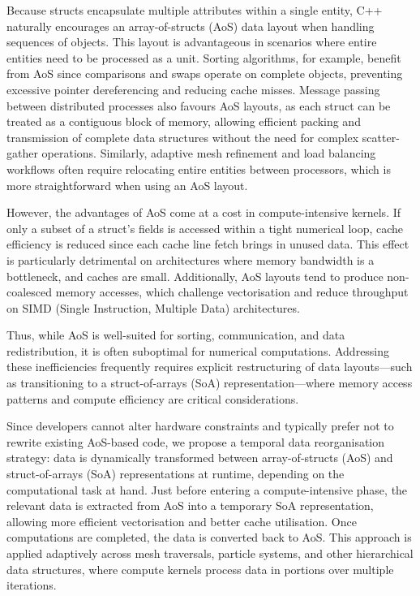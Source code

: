 Because structs encapsulate multiple attributes within a single entity, C++ naturally encourages an array-of-structs (AoS) data layout when handling sequences of objects. This layout is advantageous in scenarios where entire entities need to be processed as a unit. Sorting algorithms, for example, benefit from AoS since comparisons and swaps operate on complete objects, preventing excessive pointer dereferencing and reducing cache misses. Message passing between distributed processes also favours AoS layouts, as each struct can be treated as a contiguous block of memory, allowing efficient packing and transmission of complete data structures without the need for complex scatter-gather operations. Similarly, adaptive mesh refinement and load balancing workflows often require relocating entire entities between processors, which is more straightforward when using an AoS layout.

However, the advantages of AoS come at a cost in compute-intensive kernels. If only a subset of a struct’s fields is accessed within a tight numerical loop, cache efficiency is reduced since each cache line fetch brings in unused data. This effect is particularly detrimental on architectures where memory bandwidth is a bottleneck, and caches are small. Additionally, AoS layouts tend to produce non-coalesced memory accesses, which challenge vectorisation and reduce throughput on SIMD (Single Instruction, Multiple Data) architectures.

Thus, while AoS is well-suited for sorting, communication, and data redistribution, it is often suboptimal for numerical computations. Addressing these inefficiencies frequently requires explicit restructuring of data layouts—such as transitioning to a struct-of-arrays (SoA) representation—where memory access patterns and compute efficiency are critical considerations.

Since developers cannot alter hardware constraints and typically prefer not to rewrite existing AoS-based code, we propose a temporal data reorganisation strategy: data is dynamically transformed between array-of-structs (AoS) and struct-of-arrays (SoA) representations at runtime, depending on the computational task at hand. Just before entering a compute-intensive phase, the relevant data is extracted from AoS into a temporary SoA representation, allowing more efficient vectorisation and better cache utilisation. Once computations are completed, the data is converted back to AoS. This approach is applied adaptively across mesh traversals, particle systems, and other hierarchical data structures, where compute kernels process data in portions over multiple iterations.

